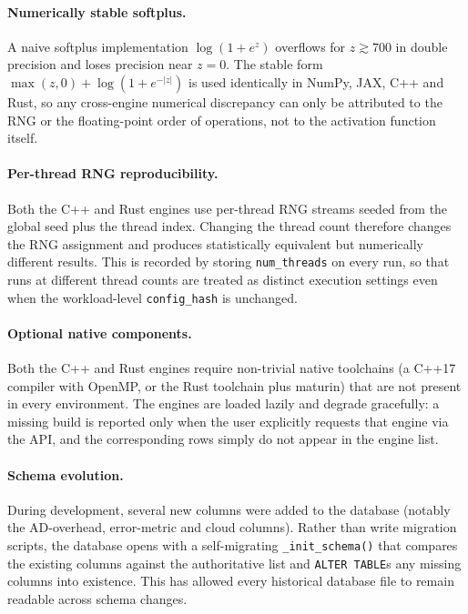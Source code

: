 \paragraph{Numerically stable softplus.}
A naive softplus implementation $\log(1 + e^{z})$ overflows for $z \gtrsim 700$
in double precision and loses precision near $z = 0$. The stable form
$\max(z, 0) + \log(1 + e^{-|z|})$ is used identically in NumPy, JAX, C++ and
Rust, so any cross-engine numerical discrepancy can only be attributed to the
RNG or the floating-point order of operations, not to the activation function
itself.

\paragraph{Per-thread RNG reproducibility.}
Both the C++ and Rust engines use per-thread RNG streams seeded from the global
seed plus the thread index. Changing the thread count therefore changes the
RNG assignment and produces statistically equivalent but numerically different
results. This is recorded by storing \texttt{num\_threads} on every run, so
that runs at different thread counts are treated as distinct execution settings
even when the workload-level \texttt{config\_hash} is unchanged.

\paragraph{Optional native components.}
Both the C++ and Rust engines require non-trivial native toolchains
(a C++17 compiler with OpenMP, or the Rust toolchain plus maturin) that are not
present in every environment. The engines are loaded lazily and degrade
gracefully: a missing build is reported only when the user explicitly requests
that engine via the API, and the corresponding rows simply do not appear in the
engine list.

\paragraph{Schema evolution.}
During development, several new columns were added to the database (notably
the AD-overhead, error-metric and cloud columns). Rather than write migration
scripts, the database opens with a self-migrating \texttt{\_init\_schema()}
that compares the existing columns against the authoritative list and
\texttt{ALTER TABLE}s any missing columns into existence. This has allowed every
historical database file to remain readable across schema changes.

